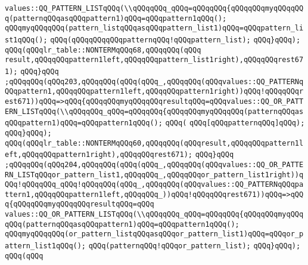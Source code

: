 \verb|values::QQ_PATTERN_LISTqQQq(\\qQQqqQQq_qQQq=qQQqqQQq{qQQqqQQqmyqQQqqQQq(patternqQQqasqQQqpattern1)qQQq=qQQqpattern1qQQq();|\newline
\verb|qQQqmyqQQqqQQq(pattern_listqQQqasqQQqpattern_list1)qQQq=qQQqpattern_list1qQQq();|\newline
\verb|qQQq(qQQqqQQqqQQqpatternqQQq!qQQqpattern_list);|\newline
\verb|qQQq}qQQq);|\newline
\verb|qQQq(qQQqlr_table::NONTERMqQQq68,qQQqqQQq(qQQq|\newline
\verb|result,qQQqqQQqpattern1left,qQQqqQQqpattern_list1right),qQQqqQQqrest671);|\newline
\verb|qQQq}qQQq|\newline
\verb|;qQQqqQQq(qQQq203,qQQqqQQq(qQQq(qQQq_,qQQqqQQq(qQQqvalues::QQ_PATTERNqQQqpattern1,qQQqqQQqpattern1left,qQQqqQQqpattern1right))qQQq!qQQqqQQqrest671))qQQq=>qQQq{qQQqqQQqmyqQQqqQQqresultqQQq=qQQqvalues::QQ_OR_PATTERN_LISTqQQq(\\qQQqqQQq_qQQq=qQQqqQQq{qQQqqQQqmyqQQqqQQq(patternqQQqasqQQqpattern1)qQQq=qQQqpattern1qQQq();|\newline
\verb|qQQq(|\newline
\verb|qQQq[qQQqpatternqQQq]qQQq);|\newline
\verb|qQQq}qQQq);|\newline
\verb|qQQq(qQQqlr_table::NONTERMqQQq60,qQQqqQQq(qQQqresult,qQQqqQQqpattern1left,qQQqqQQqpattern1right),qQQqqQQqrest671);|\newline
\verb|qQQq}qQQq|\newline
\verb|;qQQqqQQq(qQQq204,qQQqqQQq(qQQq(qQQq_,qQQqqQQq(qQQqvalues::QQ_OR_PATTERN_LISTqQQqor_pattern_list1,qQQqqQQq_,qQQqqQQqor_pattern_list1right))qQQq!qQQqqQQq_qQQq!qQQqqQQq(qQQq_,qQQqqQQq(qQQqvalues::QQ_PATTERNqQQqpattern1,qQQqqQQqpattern1left,qQQqqQQq_))qQQq!qQQqqQQqrest671))qQQq=>qQQq{qQQqqQQqmyqQQqqQQqresultqQQq=qQQq|\newline
\verb|values::QQ_OR_PATTERN_LISTqQQq(\\qQQqqQQq_qQQq=qQQqqQQq{qQQqqQQqmyqQQqqQQq(patternqQQqasqQQqpattern1)qQQq=qQQqpattern1qQQq();|\newline
\verb|qQQqmyqQQqqQQq(or_pattern_listqQQqasqQQqor_pattern_list1)qQQq=qQQqor_pattern_list1qQQq();|\newline
\verb|qQQq(patternqQQq!qQQqor_pattern_list);|\newline
\verb|qQQq}qQQq);|\newline
\verb|qQQq(qQQq|\newline
